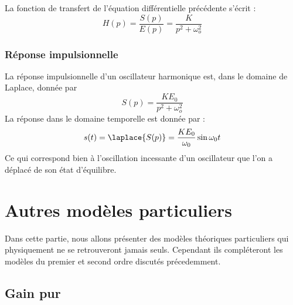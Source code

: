La fonction de transfert de l'équation différentielle précédente s'écrit :
$$
H(p)=\dfrac{S(p)}{E(p)}=\dfrac{K}{p^2+\omega_o^2}
$$

\subsubsection{Réponse impulsionnelle}
La réponse impulsionnelle d'un oscillateur harmonique est, dans le domaine 
de Laplace, donnée par 
$$
S(p)=\dfrac{KE_0}{p^2+\omega_o^2}
$$
La réponse dans le domaine temporelle est donnée par :
$$
s(t)=\laplace{S(p)}=\dfrac{KE_0}{\omega_0}\sin{\omega_0t}
$$
Ce qui correspond bien à l'oscillation incessante d'un oscillateur que l'on a 
déplacé de son état d'équilibre.

\newpage



\section{Autres modèles particuliers}



Dans cette partie, nous allons présenter des modèles théoriques particuliers 
qui physiquement ne se retrouveront jamais seuls. Cependant ils compléteront 
les modèles du premier et second ordre discutés précedemment.



\subsection{Gain pur}


